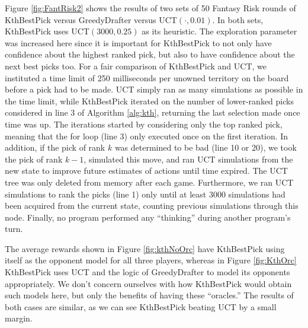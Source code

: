 \documentclass[letterpaper]{article}
\numberwithin{equation}{section}
\numberwithin{theorem}{section}
\numberwithin{lemma}{section}
\numberwithin{df}{section}
\begin{document}
Figure \ref{fig:FantRisk2} shows the results of two sets of 50 Fantasy Risk rounds of KthBestPick versus GreedyDrafter versus UCT$(\cdot, 0.01)$.  In both sets, KthBestPick uses UCT$(3000, 0.25)$ as its heuristic.  The exploration parameter was increased here since it is important for KthBestPick to not only have confidence about the highest ranked pick, but also to have confidence about the next best picks too.  For a fair comparison of KthBestPick and UCT, we instituted a time limit of 250 milliseconds per unowned territory on the board before a pick had to be made.  UCT simply ran as many simulations as possible in the time limit, while KthBestPick iterated on the number of lower-ranked picks considered in line 3 of Algorithm \ref{alg:kth}, returning the last selection made once time was up.  The iterations started by considering only the top ranked pick, meaning that the for loop (line 3) only executed once on the first iteration.  In addition, if the pick of rank $k$ was determined to be bad (line 10 or 20), we took the pick of rank $k-1$, simulated this move, and ran UCT simulations from the new state to improve future estimates of actions until time expired.  The UCT tree was only deleted from memory after each game.  Furthermore, we ran UCT simulations to rank the picks (line 1) only until at least 3000 simulations had been acquired from the current state, counting previous simulations through this node.  Finally, no program performed any ``thinking'' during another program's turn.

The average rewards shown in Figure \ref{fig:kthNoOrc} have KthBestPick using itself as the opponent model for all three players, whereas in Figure \ref{fig:KthOrc} KthBestPick uses UCT and the logic of GreedyDrafter to model its opponents appropriately.  We don't concern ourselves with how KthBestPick would obtain such models here, but only the benefits of having these ``oracles.''  The results of both cases are similar, as we can see KthBestPick beating UCT by a small margin.
\end{document}
